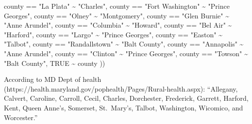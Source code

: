 \documentclass[
  letterpaper,
  DIV=11,
  numbers=noendperiod]{scrartcl}
\newenvironment{Shaded}{\begin{snugshade}}{\end{snugshade}}
\newcommand{\ConstantTok}[1]{\textcolor[rgb]{0.56,0.35,0.01}{#1}}
\newcommand{\NormalTok}[1]{\textcolor[rgb]{0.00,0.23,0.31}{#1}}
\newcommand{\SpecialCharTok}[1]{\textcolor[rgb]{0.37,0.37,0.37}{#1}}
\newcommand{\StringTok}[1]{\textcolor[rgb]{0.13,0.47,0.30}{#1}}
\begin{document}
\begin{Shaded}
\begin{Highlighting}[]
\NormalTok{     county }\SpecialCharTok{==} \StringTok{"La Plata"} \SpecialCharTok{\textasciitilde{}} \StringTok{"Charles"}\NormalTok{,}
\NormalTok{     county }\SpecialCharTok{==} \StringTok{"Fort Washington"} \SpecialCharTok{\textasciitilde{}} \StringTok{"Prince George\textquotesingle{}s"}\NormalTok{,}
\NormalTok{     county }\SpecialCharTok{==} \StringTok{"Olney"} \SpecialCharTok{\textasciitilde{}} \StringTok{"Montgomery"}\NormalTok{,}
\NormalTok{     county }\SpecialCharTok{==} \StringTok{"Glen Burnie"} \SpecialCharTok{\textasciitilde{}} \StringTok{"Anne Arundel"}\NormalTok{,}
\NormalTok{     county }\SpecialCharTok{==} \StringTok{"Columbia"} \SpecialCharTok{\textasciitilde{}} \StringTok{"Howard"}\NormalTok{,}
\NormalTok{     county }\SpecialCharTok{==} \StringTok{"Bel Air"} \SpecialCharTok{\textasciitilde{}} \StringTok{"Harford"}\NormalTok{,}
\NormalTok{     county }\SpecialCharTok{==} \StringTok{"Largo"} \SpecialCharTok{\textasciitilde{}} \StringTok{"Prince George\textquotesingle{}s"}\NormalTok{,}
\NormalTok{     county }\SpecialCharTok{==} \StringTok{"Easton"} \SpecialCharTok{\textasciitilde{}} \StringTok{"Talbot"}\NormalTok{,}
\NormalTok{     county }\SpecialCharTok{==} \StringTok{"Randallstown"} \SpecialCharTok{\textasciitilde{}} \StringTok{"Balt County"}\NormalTok{,}
\NormalTok{     county }\SpecialCharTok{==} \StringTok{"Annapolis"} \SpecialCharTok{\textasciitilde{}} \StringTok{"Anne Arundel"}\NormalTok{,}
\NormalTok{     county }\SpecialCharTok{==} \StringTok{"Clinton"} \SpecialCharTok{\textasciitilde{}} \StringTok{"Prince George\textquotesingle{}s"}\NormalTok{,}
\NormalTok{     county }\SpecialCharTok{==} \StringTok{"Towson"} \SpecialCharTok{\textasciitilde{}} \StringTok{"Balt County"}\NormalTok{,}
     \ConstantTok{TRUE} \SpecialCharTok{\textasciitilde{}}\NormalTok{ county  }
\NormalTok{   ))}
\end{Highlighting}
\end{Shaded}

According to MD Dept of health
(https://health.maryland.gov/pophealth/Pages/Rural-health.aspx):
``Allegany, Calvert, Caroline, Carroll, Cecil, Charles, Dorchester,
Frederick, Garrett, Harford, Kent, Queen Anne's, Somerset, St.~Mary's,
Talbot, Washington, Wicomico, and Worcester.''
\end{document}
